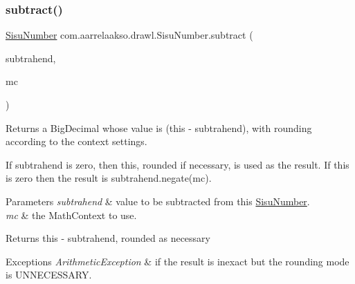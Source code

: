 \subsubsection{\texorpdfstring{subtract()}{subtract()}\hspace{0.1cm}{\footnotesize\ttfamily [2/3]}}
{\footnotesize\ttfamily \hyperlink{classcom_1_1aarrelaakso_1_1drawl_1_1_sisu_number}{Sisu\+Number} com.\+aarrelaakso.\+drawl.\+Sisu\+Number.\+subtract (\begin{DoxyParamCaption}\item[{@Not\+Null \hyperlink{classcom_1_1aarrelaakso_1_1drawl_1_1_sisu_number}{Sisu\+Number}}]{subtrahend,  }\item[{Math\+Context}]{mc }\end{DoxyParamCaption})\hspace{0.3cm}{\ttfamily [protected]}}



Returns a Big\+Decimal whose value is (this -\/ subtrahend), with rounding according to the context settings. 

If subtrahend is zero, then this, rounded if necessary, is used as the result. If this is zero then the result is subtrahend.\+negate(mc).


\begin{DoxyParams}{Parameters}
{\em subtrahend} & value to be subtracted from this \hyperlink{classcom_1_1aarrelaakso_1_1drawl_1_1_sisu_number}{Sisu\+Number}. \\
\hline
{\em mc} & the Math\+Context to use. \\
\hline
\end{DoxyParams}
\begin{DoxyReturn}{Returns}
this -\/ subtrahend, rounded as necessary 
\end{DoxyReturn}

\begin{DoxyExceptions}{Exceptions}
{\em Arithmetic\+Exception} & if the result is inexact but the rounding mode is U\+N\+N\+E\+C\+E\+S\+S\+A\+RY. \\
\hline
\end{DoxyExceptions}
\mbox{\label{classcom_1_1aarrelaakso_1_1drawl_1_1_sisu_number_a16d6415b9c006f6d27a8ad5c60e77d03}} 
